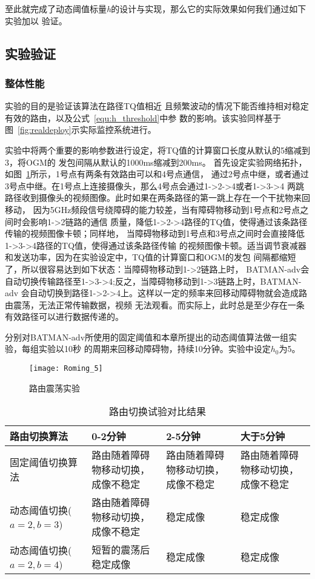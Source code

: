 至此就完成了动态阈值标量\emph{h}的设计与实现，那么它的实际效果如何我们通过如下实验加以
验证。

\subsection{实验验证}
\renewcommand{\thesubsubsection}{\Alph{subsubsection}.}
\subsubsection{整体性能}
实验的目的是验证该算法在路径TQ值相近
且频繁波动的情况下能否维持相对稳定有效的路由，以及公式~\ref{equ:h_threshold}中参
数的影响。该实验同样基于图~\ref{fig:realdeploy}示实际监控系统进行。

实验中将两个重要的影响参数进行设定，将TQ值的计算窗口长度从默认的5缩减到3，将OGM的
发包间隔从默认的1000ms缩减到200ms。
首先设定实验网络拓扑，如图~\ref{fig:roming_5}所示，1号点有两条有效路由可以和4号点通信，
通过2号点中继，或者通过3号点中继。在1号点上连接摄像头，那么4号点会通过1->2->4或者1->3->4
两跳路径收到摄像头的视频图像。此时如果在两条路径的第一跳上存在一个干扰物来回移动，
因为5GHz频段信号绕障碍的能力较差，当有障碍物移动到1号点和2号点之间时会影响1->2链路的通信
质量，降低1->2->4路径的TQ值，使得通过该条路径传输的视频图像卡顿；同样地，
当障碍物移动到1号点和3号点之间时会直接降低1->3->4路径的TQ值，使得通过该条路径传输
的视频图像卡顿。适当调节衰减器和发送功率，因为在实验设定中，TQ值的计算窗口和OGM的发包
间隔都缩短了，所以很容易达到如下状态：当障碍物移动到1->2链路上时，
BATMAN-adv会自动切换传输路径至1->3->4;反之，当障碍物移动到1->3链路上时，BATMAN-adv
会自动切换到路径1->2->4上。这样以一定的频率来回移动障碍物就会造成路由震荡，无法正常传输数据，视频
无法观看。而实际上，此时总是至少存在一条有效路径可以进行数据传递的。

分别对BATMAN-adv所使用的固定阈值和本章所提出的动态阈值算法做一组实验，每组实验以10秒
的周期来回移动障碍物，持续10分钟。实验中设定$h_{0}$为5。

\begin{figure}[H] %
  \centering
  \texttt{[image: Roming\_5]}
  \caption{路由震荡实验}
  \label{fig:roming_5}
\end{figure}

\begin{table}[htbp]
  \centering
  \caption{路由切换试验对比结果}
  \label{tab:roming_tab_1}
  \begin{tabular}{|p{3cm}|p{3cm}|p{3cm}|p{3cm}|}
  \hline
  路由切换算法 & 0-2分钟 & 2-5分钟 & 大于5分钟 \\
  \hline
  固定阈值切换算法 & 路由随着障碍物移动切换，成像不稳定 & 路由随着障碍物移动切换，成像不稳定& 路由随着障碍物移动切换，成像不稳定\\
  \hline
  动态阈值切换($a=2, b=3$) & 路由随着障碍物移动切换，成像不稳定 & 稳定成像 & 稳定成像\\
  \hline
  动态阈值切换($a=2, b=4$) & 短暂的震荡后稳定成像 & 稳定成像 & 稳定成像\\
  \hline
  \end{tabular}
\end{table}

